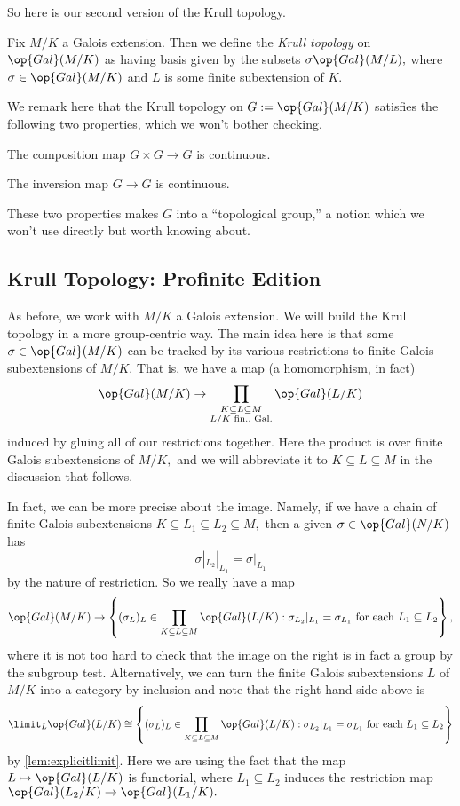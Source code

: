 \documentclass[../notes.tex]{subfiles}
\begin{document}
So here is our second version of the Krull topology.
\begin{defi}
	Fix $M/K$ a Galois extension. Then we define the \textit{Krull topology} on $\op{Gal}(M/K)$ as having basis given by the subsets $\sigma\op{Gal}(M/L),$ where $\sigma\in\op{Gal}(M/K)$ and $L$ is some finite {sub}extension of $K.$
\end{defi}
\begin{remark}
	We remark here that the Krull topology on $G:=\op{Gal}(M/K)$ satisfies the following two properties, which we won't bother checking.
	\begin{listalph}
		\item The composition map $G\times G\to G$ is continuous.
		\item The inversion map $G\to G$ is continuous.
	\end{listalph}
	These two properties makes $G$ into a ``topological group,'' a notion which we won't use directly but worth knowing about.
\end{remark}

\subsection{Krull Topology: Profinite Edition}
As before, we work with $M/K$ a Galois extension. We will build the Krull topology in a more group-centric way. The main idea here is that some $\sigma\in\op{Gal}(M/K)$ can be tracked by its various restrictions to finite Galois {sub}extensions of $M/K.$ That is, we have a map (a homomorphism, in fact)
\[\op{Gal}(M/K)\to\prod_{\substack{K\subseteq L\subseteq M\\L/K\text{ fin., Gal.}}}\op{Gal}(L/K)\]
induced by gluing all of our restrictions together. Here the product is over finite Galois {sub}extensions of $M/K,$ and we will abbreviate it to $K\subseteq L\subseteq M$ in the discussion that follows.

In fact, we can be more precise about the image. Namely, if we have a chain of finite Galois {sub}extensions $K\subseteq L_1\subseteq L_2\subseteq M,$ then a given $\sigma\in\op{Gal}(N/K)$ has
\[\sigma|_{L_2}|_{L_1}=\sigma|_{L_1}\]
by the nature of restriction. So we really have a map
\[\op{Gal}(M/K)\to\left\{(\sigma_L)_L\in\prod_{K\subseteq L\subseteq M}\op{Gal}(L/K):\sigma_{L_2}|_{L_1}=\sigma_{L_1}\text{ for each }L_1\subseteq L_2\right\},\]
where it is not too hard to check that the image on the right is in fact a group by the subgroup test. Alternatively, we can turn the finite Galois subextensions $L$ of $M/K$ into a category by inclusion and note that the right-hand side above is
\[\limit_L\op{Gal}(L/K)\cong\left\{(\sigma_L)_L\in\prod_{K\subseteq L\subseteq M}\op{Gal}(L/K):\sigma_{L_2}|_{L_1}=\sigma_{L_1}\text{ for each }L_1\subseteq L_2\right\}\]
by \autoref{lem:explicitlimit}. Here we are using the fact that the map $L\mapsto\op{Gal}(L/K)$ is functorial, where $L_1\subseteq L_2$ induces the restriction map $\op{Gal}(L_2/K)\to\op{Gal}(L_1/K).$
\end{document}
